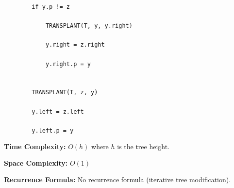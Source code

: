\documentclass[a4paper,12pt]{article}
\begin{document}
\begin{tcolorbox}[
    colback=gray!30,
    colframe=black,
    boxrule=1pt,
    arc=0mm
]
\begin{tcolorbox}[
    colback=black!5,
    colframe=black,
    arc=0mm,
    title=Pseudo-code
]
\begin{lstlisting}
        if y.p != z

            TRANSPLANT(T, y, y.right)

            y.right = z.right

            y.right.p = y


        TRANSPLANT(T, z, y)

        y.left = z.left

        y.left.p = y
\end{lstlisting}
\end{tcolorbox}


\begin{tcolorbox}[
    colback=cyan!20,
    colframe=black,
    arc=0mm
]
\small
\textbf{Time Complexity:}
$O(h)$ where $h$ is the tree height.
\end{tcolorbox}


\begin{tcolorbox}[
    colback=violet!20,
    colframe=black,
    arc=0mm
]
\small
\textbf{Space Complexity:}
$O(1)$
\end{tcolorbox}


\begin{tcolorbox}[
    colback=pink!20,
    colframe=black,
    arc=0mm
]
\small
\textbf{Recurrence Formula:}
No recurrence formula (iterative tree modification).
\end{tcolorbox}

\end{tcolorbox}
\end{document}
